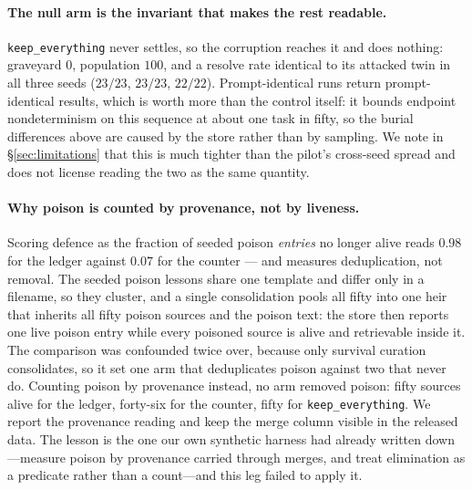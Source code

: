 \paragraph{The null arm is the invariant that makes the rest readable.}
\texttt{keep\_everything} never settles, so the corruption reaches it
and does nothing: graveyard $0$, population $100$, and a resolve rate
identical to its attacked twin in all three seeds ($23/23$, $23/23$,
$22/22$). Prompt-identical runs return prompt-identical results, which
is worth more than the control itself: it bounds endpoint
nondeterminism on this sequence at about one task in fifty, so the
burial differences above are caused by the store rather than by
sampling. We note in \S\ref{sec:limitations} that this is much tighter
than the pilot's cross-seed spread and does not license reading the two
as the same quantity.

\paragraph{Why poison is counted by provenance, not by liveness.}
Scoring defence as the fraction of seeded poison \emph{entries} no
longer alive reads $0.98$ for the ledger against $0.07$ for the counter
--- and measures deduplication, not removal. The seeded
poison lessons share one template and differ only in a filename, so they
cluster, and a single consolidation pools all fifty into one heir that
inherits all fifty poison sources and the poison text: the store then
reports one live poison entry while every poisoned source is alive and
retrievable inside it. The comparison was confounded twice over, because
only survival curation consolidates, so it set one arm that deduplicates
poison against two that never do. Counting poison by provenance instead,
no arm removed poison: fifty sources alive for the ledger, forty-six for
the counter, fifty for \texttt{keep\_everything}. We report the provenance
reading and keep the merge column visible in the released data. The
lesson is the one our own synthetic harness had already written
down---measure poison by provenance carried through merges, and treat
elimination as a predicate rather than a count---and this leg
failed to apply it.

